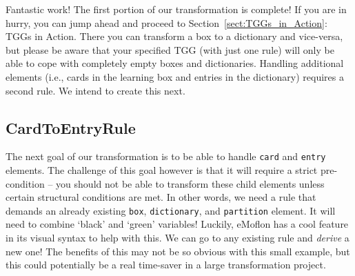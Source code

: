 Fantastic work! The first portion of our transformation is complete! If you are in hurry, you can jump ahead and proceed to Section~\ref{sect:TGGs_in_Action}:
TGGs in Action. There you can transform a box to a dictionary and vice-versa, but please be aware that your specified TGG (with just one rule) will only be
able to cope with completely empty boxes and dictionaries. Handling additional elements (i.e., cards in the learning box and entries in the dictionary) requires
a second rule. We intend to create this next.

\subsection{CardToEntryRule}

The next goal of our transformation is to be able to handle \texttt{card} and \texttt{entry} elements. The challenge of this goal however is that it will
require a strict pre-condition -- you should not be able to transform these child elements unless certain structural conditions are met. In other words, we need
a rule that demands an already existing \texttt{box}, \texttt{dictionary}, and \texttt{partition} element. It will need to combine `black' and `green'
variables! Luckily, eMoflon has a cool feature in its visual syntax to help with this. We can go to any existing rule and \emph{derive} a new one! The
benefits of this may not be so obvious with this small example, but this could potentially be a real time-saver in a large transformation project.

